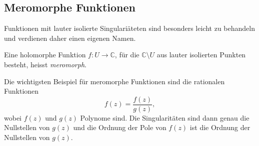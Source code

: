 %
%
%
\subsection{Meromorphe Funktionen}
Funktionen mit lauter isolierte Singulariäteten sind besonders
leicht zu behandeln und verdienen daher einen eigenen Namen.

\begin{definition}
Eine holomorphe Funktion $f\colon U\to\mathbb{C}$,
für die $\mathbb{C}\setminus U$ aus lauter isolierten Punkten besteht,
heisst \emph{meromorph}.
%
\end{definition}

Die wichtigsten Beispiel für meromorphe Funktionen sind die rationalen
Funktionen
\[
f(z)
=
\frac{f(z)}{g(z)},
\]
wobei $f(z)$ und $g(z)$ Polynome sind.
Die Singularitäten sind dann genau die Nullstellen von $g(z)$ und die
Ordnung der Pole von $f(z)$ ist die Ordnung der Nullstellen von $g(z)$.



